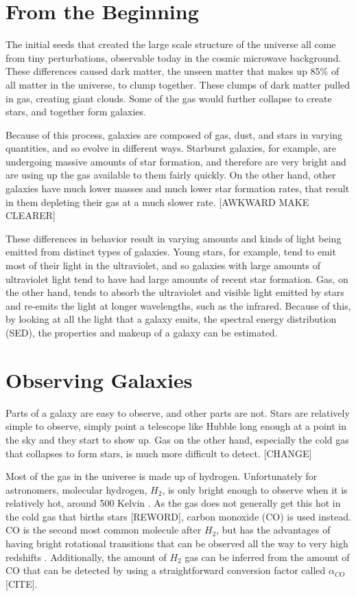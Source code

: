 \documentclass[twoside,single]{lion-msc}
\begin{document}
\section{From the Beginning}

The initial seeds that created the large scale structure of the universe all come from tiny perturbations, observable today in the cosmic microwave background. These differences caused dark matter, the unseen matter that makes up 85\% of all matter in the universe, to clump together. These clumps of dark matter pulled in gas, creating giant clouds. Some of the gas would further collapse to create stars, and together form galaxies.

Because of this process, galaxies are composed of gas, dust, and stars in varying quantities, and so evolve in different ways. Starburst galaxies, for example, are undergoing massive amounts of star formation, and therefore are very bright and are using up the gas available to them fairly quickly. On the other hand, other galaxies have much lower masses and much lower star formation rates, that result in them depleting their gas at a much slower rate. [AWKWARD MAKE CLEARER]

These differences in behavior result in varying amounts and kinds of light being emitted from distinct types of galaxies. Young stars, for example, tend to emit most of their light in the ultraviolet, and so galaxies with large amounts of ultraviolet light tend to have had large amounts of recent star formation. Gas, on the other hand, tends to absorb the ultraviolet and visible light emitted by stars and re-emits the light at longer wavelengths, such as the infrared. Because of this, by looking at all the light that a galaxy emits, the spectral energy distribution (SED), the properties and makeup of a galaxy can be estimated.

\section{Observing Galaxies}

Parts of a galaxy are easy to observe, and other parts are not. Stars are relatively simple to observe, simply point a telescope like Hubble long enough at a point in the sky and they start to show up. Gas on the other hand, especially the cold gas that collapses to form stars, is much more difficult to detect. [CHANGE] 

Most of the gas in the universe is made up of hydrogen. Unfortunately for astronomers, molecular hydrogen, $H_2$, is only bright enough to observe when it is relatively hot, around 500 Kelvin \cite{decarli2019alma}. As the gas does not generally get this hot in the cold gas that births stars [REWORD], carbon monoxide (CO) is used instead. CO is the second most common molecule after $H_2$, but has the advantages of having bright rotational transitions that can be observed all the way to very high redshifts \cite{walter2016alma, decarli2019alma}. Additionally, the amount of $H_2$ gas can be inferred from the amount of CO that can be detected by using a straightforward conversion factor called $\alpha_{CO}$ [CITE]. 
\end{document}

